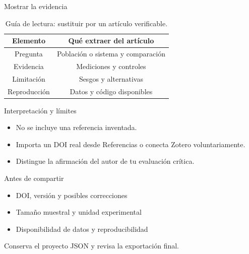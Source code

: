 \documentclass[aspectratio=169,11pt]{beamer}
\begin{document}
\begin{frame}{Mostrar la evidencia}
  \transdissolve[duration=0.25]
  \begin{table}
    \centering
    \caption{Guía de lectura: sustituir por un artículo verificable.}
    \begin{tabular}{cc}
      \toprule
      \textbf{Elemento} & \textbf{Qué extraer del artículo} \\
      \midrule
      Pregunta & Población o sistema y comparación \\
      Evidencia & Mediciones y controles \\
      Limitación & Sesgos y alternativas \\
      Reproducción & Datos y código disponibles \\
      \bottomrule
    \end{tabular}
  \end{table}
\end{frame}

\begin{frame}{Interpretación y límites}
  \transdissolve[duration=0.25]
  \begin{itemize}
    \item No se incluye una referencia inventada.
    \item Importa un DOI real desde Referencias o conecta Zotero voluntariamente.
    \item Distingue la afirmación del autor de tu evaluación crítica.
  \end{itemize}
\end{frame}

\begin{frame}{Antes de compartir}
  \transdissolve[duration=0.25]
  \begin{itemize}
    \item DOI, versión y posibles correcciones
    \item Tamaño muestral y unidad experimental
    \item Disponibilidad de datos y reproducibilidad
  \end{itemize}
  \medskip

  {\small Conserva el proyecto JSON y revisa la exportación final.}
\end{frame}
\end{document}

